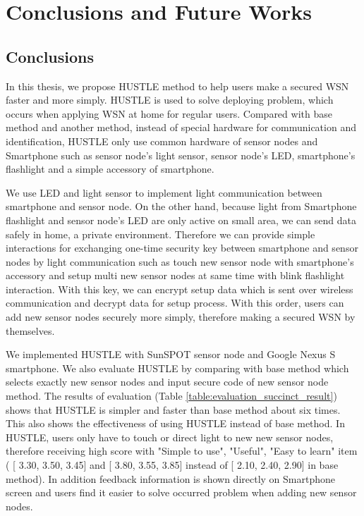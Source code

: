 \chapter{Conclusions and Future Works}\label{chap:conc}
\section{Conclusions}\label{sec:conc_conclucsion}

In this thesis, we propose HUSTLE method to help users make a secured WSN faster and more simply. HUSTLE is used to solve deploying problem, which occurs when applying WSN at home for regular users. Compared with base method and another method, instead of special hardware for communication and identification, HUSTLE only use common hardware of sensor nodes and Smartphone such as sensor node's light sensor, sensor node's LED, smartphone's flashlight and a simple accessory of smartphone. 

We use LED and light sensor to implement light communication between smartphone and sensor node. On the other hand, because light from Smartphone flashlight and sensor node's LED are only active on small area, we can send data safely in home, a private environment. Therefore we can provide simple interactions for exchanging one-time security key between smartphone and sensor nodes by light communication such as touch new sensor node with smartphone's accessory and setup multi new sensor nodes at same time with blink flashlight interaction. With this key, we can encrypt setup data which is sent over wireless communication and decrypt data for setup process. With this order, users can add new sensor nodes securely more simply, therefore making a secured WSN by themselves.

We implemented HUSTLE with SunSPOT sensor node and Google Nexus S smartphone. We also evaluate HUSTLE by comparing with base method which selects exactly new sensor nodes and input secure code of new sensor node method. The results of evaluation (Table \ref{table:evaluation_succinct_result}) shows that HUSTLE is simpler and faster than base method about six times. This also shows the effectiveness of using HUSTLE instead of base method. In HUSTLE, users only have to touch or direct light to new new sensor nodes, therefore receiving high score with "Simple to use", "Useful", "Easy to learn" item ( [ 3.30, 3.50, 3.45] and [ 3.80, 3.55, 3.85] instead of [ 2.10, 2.40, 2.90] in base method). In addition feedback information is shown directly on Smartphone screen and users find it easier to solve occurred problem when adding new sensor nodes.
